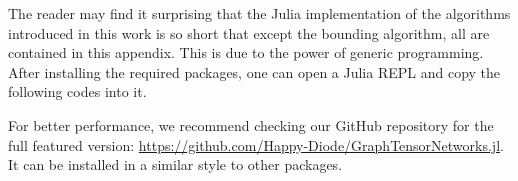 \documentclass[onefignum, onetabnum]{siamart190516}
\newcommand{\<}{\langle}
\renewcommand{\>}{\rangle}
\begin{document}
The reader may find it surprising that the Julia implementation of the algorithms introduced in this work is so short that except the bounding algorithm,
all are contained in this appendix. This is due to the power of generic programming. After installing the required packages, one can open a Julia REPL and copy the following codes into it.



For better performance, we recommend checking our GitHub repository for the full featured version:
\href{https://github.com/Happy-Diode/GraphTensorNetworks.jl}{https://github.com/Happy-Diode/GraphTensorNetworks.jl}.
It can be installed in a similar style to other packages.
\end{document}
